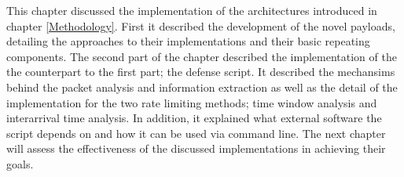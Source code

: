This chapter discussed the implementation of the architectures introduced in chapter \ref{Methodology}. First it described the development of the novel payloads, detailing the approaches to their implementations and their basic repeating components. The second part of the chapter described the implementation of the the counterpart to the first part; the defense script. It described the mechansims behind the packet analysis and information extraction as well as the detail of the implementation for the two rate limiting methods; time window analysis and interarrival time analysis. In addition, it explained what external software the script depends on and how it can be used via command line. The next chapter will assess the effectiveness of the discussed implementations in achieving their goals.   

